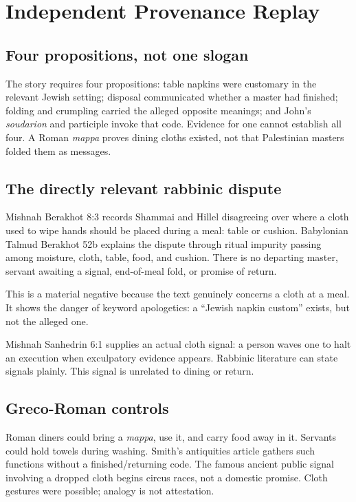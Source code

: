 \section{Independent Provenance Replay}

\subsection{Four propositions, not one slogan}

The story requires four propositions: table napkins were customary in the
relevant Jewish setting; disposal communicated whether a master had finished;
folding and crumpling carried the alleged opposite meanings; and John's
\emph{soudarion} and participle invoke that code. Evidence for one cannot
establish all four. A Roman \emph{mappa} proves dining cloths existed, not that
Palestinian masters folded them as messages.

\subsection{The directly relevant rabbinic dispute}

Mishnah Berakhot 8:3 records Shammai and Hillel disagreeing over where a cloth
used to wipe hands should be placed during a meal: table or cushion. Babylonian
Talmud Berakhot 52b explains the dispute through ritual impurity passing among
moisture, cloth, table, food, and cushion. There is no departing master, servant
awaiting a signal, end-of-meal fold, or promise of return.

This is a material negative because the text genuinely concerns a cloth at a
meal. It shows the danger of keyword apologetics: a ``Jewish napkin custom''
exists, but not the alleged one.

Mishnah Sanhedrin 6:1 supplies an actual cloth signal: a person waves one to
halt an execution when exculpatory evidence appears. Rabbinic literature can
state signals plainly. This signal is unrelated to dining or return.

\subsection{Greco-Roman controls}

Roman diners could bring a \emph{mappa}, use it, and carry food away in it.
Servants could hold towels during washing. Smith's antiquities article gathers
such functions without a finished/returning code. The famous ancient public
signal involving a dropped cloth begins circus races, not a domestic promise.
Cloth gestures were possible; analogy is not attestation.

